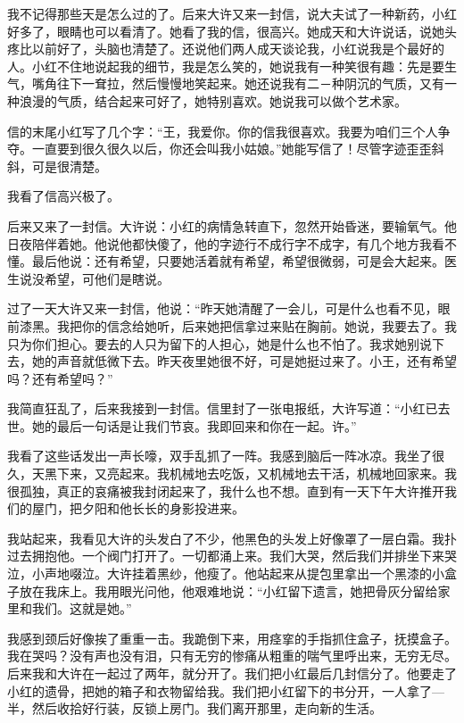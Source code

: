 我不记得那些天是怎么过的了。后来大许又来一封信，说大夫试了一种新药，小红好多了，眼睛也可以看清了。她看了我的信，很高兴。她成天和大许说话，说她头疼比以前好了，头脑也清楚了。还说他们两人成天谈论我，小红说我是个最好的人。小红不住地说起我的细节，我是怎么笑的，她说我有一种笑很有趣：先是要生气，嘴角往下一耷拉，然后慢慢地笑起来。她还说我有二－种阴沉的气质，又有一种浪漫的气质，结合起来可好了，她特别喜欢。她说我可以做个艺术家。 

信的末尾小红写了几个字：“王，我爱你。你的信我很喜欢。我要为咱们三个人争夺。一直要到很久很久以后，你还会叫我小姑娘。”她能写信了！尽管字迹歪歪斜斜，可是很清楚。 

我看了信高兴极了。 

后来又来了一封信。大许说：小红的病情急转直下，忽然开始昏迷，要输氧气。他日夜陪伴着她。他说他都快傻了，他的字迹行不成行字不成字，有几个地方我看不懂。最后他说：还有希望，只要她活着就有希望，希望很微弱，可是会大起来。医生说没希望，可他们是瞎说。 

过了一天大许又来一封信，他说：“昨天她清醒了一会儿，可是什么也看不见，眼前漆黑。我把你的信念给她听，后来她把信拿过来贴在胸前。她说，我要去了。我只为你们担心。要去的人只为留下的人担心，她是什么也不怕了。我求她别说下去，她的声音就低微下去。昨天夜里她很不好，可是她挺过来了。小王，还有希望吗？还有希望吗？” 

我简直狂乱了，后来我接到一封信。信里封了一张电报纸，大许写道：“小红已去世。她的最后一句话是让我们节哀。我即回来和你在一起。许。” 

我看了这些话发出一声长嚎，双手乱抓了一阵。我感到脑后一阵冰凉。我坐了很久，天黑下来，又亮起来。我机械地去吃饭，又机械地去干活，机械地回家来。我很孤独，真正的哀痛被我封闭起来了，我什么也不想。直到有一天下午大许推开我们的屋门，把夕阳和他长长的身影投进来。 

我站起来，我看见大许的头发白了不少，他黑色的头发上好像罩了一层白霜。我扑过去拥抱他。一个阀门打开了。一切都涌上来。我们大哭，然后我们并排坐下来哭泣，小声地啜泣。大许挂着黑纱，他瘦了。他站起来从提包里拿出一个黑漆的小盒子放在我床上。我用眼光问他，他艰难地说：“小红留下遗言，她把骨灰分留给家里和我们。这就是她。” 

我感到颈后好像挨了重重一击。我跪倒下来，用痉挛的手指抓住盒子，抚摸盒子。我在哭吗？没有声也没有泪，只有无穷的惨痛从粗重的喘气里呼出来，无穷无尽。 后来我和大许在一起过了两年，就分开了。我们把小红最后几封信分了。他要走了小红的遗骨，把她的箱子和衣物留给我。我们把小红留下的书分开，一人拿了—半，然后收拾好行装，反锁上房门。我们离开那里，走向新的生活。
